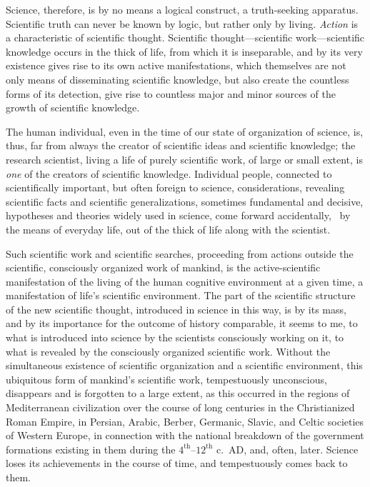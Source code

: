 \Section %
Science, therefore, is by no means a logical construct, a truth-seeking
apparatus.  Scientific truth can never be known by logic, but rather only by
living.  \emph{Action }is a characteristic of scientific thought.  Scientific
thought---scientific work---scientific knowledge occurs in the thick of life,
from which it is inseparable, and by its very existence gives rise to its own
active manifestations, which themselves are not only means of disseminating
scientific knowledge, but also create the countless forms of its detection,
give rise to countless major and minor sources of the growth of scientific
knowledge.

The human individual, even in the time of our state of organization of science,
is, thus, far from always the creator of scientific ideas and scientific
knowledge; the research scientist, living a life of purely scientific work, of
large or small extent, is \emph{one} of the creators of scientific knowledge.
Individual people, connected to scientifically important, but often foreign to
science, considerations, revealing scientific facts and scientific
generalizations, sometimes fundamental and decisive, hypotheses and theories
widely used in science, come forward accidentally, \ie\ by the means of
everyday life, out of the thick of life along with the scientist.

Such scientific work and scientific searches, proceeding from actions outside
the scientific, consciously organized work of mankind, is the active-scientific
manifestation of the living of the human cognitive environment at a given time,
a manifestation of life's scientific environment.  The part of the scientific
structure of the new scientific thought, introduced in science in this way, is
by its mass, and by its importance for the outcome of history comparable, it
seems to me, to what is introduced into science by the scientists consciously
working on it, to what is revealed by the consciously organized scientific
work.  Without the simultaneous existence of scientific organization and a
scientific environment, this ubiquitous form of mankind's scientific work,
tempestuously unconscious, disappears and is forgotten to a large extent, as
this occurred in the regions of Mediterranean civilization over the course of
long centuries in the Christianized Roman Empire, in Persian, Arabic, Berber,
Germanic, Slavic, and Celtic societies of Western Europe, in connection with
the national breakdown of the government formations existing in them during the
$4^\mathrm{th}$--$12^\mathrm{th}$ c.\ AD, and, often, later.  Science loses its
achievements in the course of time, and tempestuously comes back to them.

